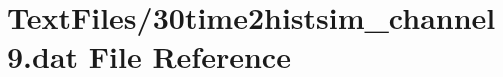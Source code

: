 \hypertarget{30time2histsim__channel9_8dat}{}\section{Text\+Files/30time2histsim\+\_\+channel9.dat File Reference}
\label{30time2histsim__channel9_8dat}
